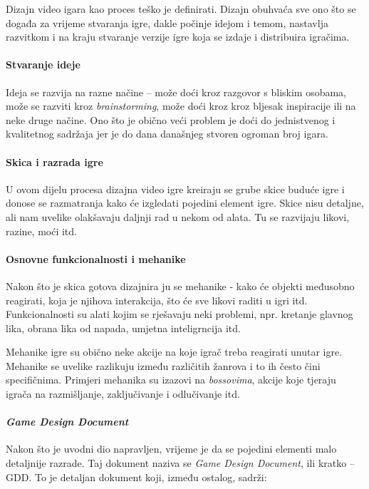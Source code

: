 \documentclass[a4paper,10pt]{article}
\begin{document}
Dizajn video igara kao proces teško je definirati. Dizajn obuhvaća sve ono što
se događa za vrijeme stvaranja igre, dakle počinje idejom i temom, nastavlja
razvitkom i na kraju stvaranje verzije igre koja se izdaje i distribuira
igračima.

\paragraph{Stvaranje ideje}

Ideja se razvija na razne načine -- može doći kroz razgovor s bliskim osobama,
može se razviti kroz \textit{brainstorming}, može doći kroz kroz bljesak
inspiracije ili na neke druge načine. Ono što je obično veći problem je doći do
jednistvenog i kvalitetnog sadržaja jer je do dana današnjeg stvoren ogroman
broj igara.

\paragraph{Skica i razrada igre}

U ovom dijelu procesa dizajna video igre kreiraju se grube skice buduće igre i
donose se razmatranja kako će izgledati pojedini element igre. Skice nisu
detaljne, ali nam uvelike olakšavaju daljnji rad u nekom od alata. Tu se
razvijaju likovi, razine, moći itd.

\paragraph{Osnovne funkcionalnosti i mehanike}

Nakon što je skica gotova dizajnira ju se mehanike - kako će objekti međusobno
reagirati, koja je njihova interakcija, što će sve likovi raditi u igri itd.
Funkcionalnosti su alati kojim se rješavaju neki problemi, npr. kretanje
glavnog lika, obrana lika od napada, umjetna inteligrncija itd.

Mehanike igre su obično neke akcije na koje igrač treba reagirati unutar igre.
Mehanike se uvelike razlikuju između različitih žanrova i to ih često čini
specifičnima. Primjeri mehanika su izazovi na \textit{bossovima}, akcije koje
tjeraju igrača na razmišljanje, zaključivanje i odlučivanje itd.

\paragraph{\textit{Game Design Document}}

Nakon što je uvodni dio napravljen, vrijeme je da se pojedini elementi malo
detaljnije razrade. Taj dokument naziva se \textit{Game Design Document}, ili
kratko -- GDD. To je detaljan dokument koji, između ostalog, sadrži:
\end{document}
